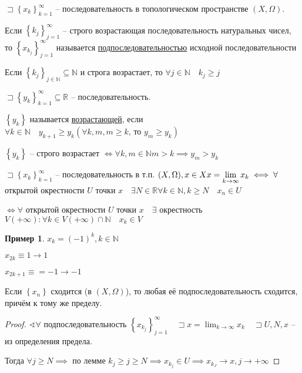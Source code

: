 \documentclass{book}
\newcommand\N{\ensuremath{\mathbb{N}}}
\newcommand\R{\ensuremath{\mathbb{R}}}
\theoremstyle{definition}
\newtheorem*{example}{Пример}
\begin{document}
\begin{definition}
    $\sqsupset \left\{ x_k \right\} _{k=1}^{\infty }$ -- последовательность в топологическом пространстве $(X, \Omega)$.

    Если  $\left\{ k_j \right\} _{j=1}^{\infty }$ -- строго возрастающая последовательность натуральных чисел, то $\left\{ x_{k_j} \right\} _{j=1}^{\infty }$ называется \underline{подпоследовательностью} исходной последовательности 
\end{definition}

\begin{lemma}
    Если $\left\{ k_j \right\} _{j\in \N }\subseteq \N $ и строга возрастает, то $\forall j\in \N \quad k_j\geqslant j$
\end{lemma}

\begin{definition}
    $\sqsupset \left\{ y_k \right\} _{k=1}^{\infty }\subseteq \R$ -- последовательность. 

    $\left\{ y_k \right\} $ называется \underline{возрастающей}, если $\forall k\in \N \quad y_{k+1}\geqslant y_k \left( \forall k, m, m\geqslant k \text{, то } y_m\geqslant y_k \right) $ 

    $\left\{ y_k \right\} $ -- строго возрастает $\iff  \forall k, m\in \N m>k\implies y_m>y_k$
\end{definition}
\begin{definition}
    $\sqsupset \left\{ x_k \right\} _{k=1}^{\infty }$ -- последовательность в т.п. $(X, \Omega), x\in X\quad \\ x = \lim_{k \to \infty} x_k \iff \forall $ открытой окрестности $U$ точки  $x\quad \exists N\in \R\forall k\in \N , k\geqslant N\quad x_n\in U$

    $\iff  \forall $ открытой окрестности $U$ точки $x\quad \exists $ окрестность $V(+\infty ): \forall k\in V(+\infty )\cap \N \quad x_k\in V$
\end{definition}
\begin{example}
    $x_k = (-1)^k, k\in \N $

    $x_{2k} \equiv 1 \to 1$

    $x_{2k+1}\equiv = -1 \to -1$
\end{example}
\begin{statement}
    Если $\left\{ x_{n}  \right\} $ сходится (в $(X, \Omega)$), то любая её подпоследовательность сходится, причём к тому же пределу.
\end{statement}
\begin{proof}
    $\sphericalangle \forall $ подпоследовательность $\left\{ x_{k_j} \right\} _{j=1}^{\infty }\quad \sqsupset x = \lim_{k \to \infty} x_k\quad \sqsupset U, N, x$ -- из определения предела.

    Тогда $\forall j\geqslant N \implies  $ по лемме $ k_j\geqslant j\geqslant N \implies  x_{k_j}\in U \implies  x_{k_J} \to x, j\to +\infty $
\end{proof}
\end{document}
